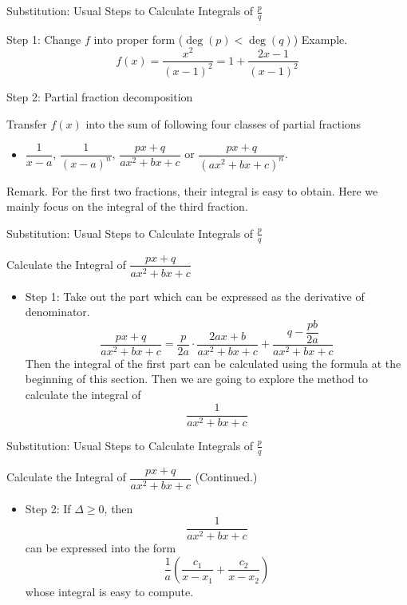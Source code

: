 \documentclass{beamer}
\begin{document}
    \begin{frame}[t]{Substitution: Usual Steps to Calculate Integrals of $\frac{p}{q}$}
        \begin{block}{Step 1: Change $f$ into proper form ($\deg(p) < \deg(q)$)}
            \textcolor{yy}{Example.} $$f(x)=\dfrac{x^2}{(x-1)^2}=1+\dfrac{2x-1}{(x-1)^2}$$
        \end{block}
        \begin{block}{Step 2: Partial fraction decomposition}
            \par Transfer $f(x)$ into the sum of following four classes of partial fractions
            \begin{itemize}
                \item $\dfrac{1}{x-a}$, $\dfrac{1}{(x-a)^{n}}$, $\dfrac{px+q}{ax^{2}+bx+c}$ or $\dfrac{px+q}{(ax^{2}+bx+c)^n}$.
            \end{itemize}
        \end{block}
        \par \textcolor{yy}{Remark.} For the first two fractions, their integral is easy to obtain. Here we mainly focus on the integral of the third fraction.
    \end{frame}

    \begin{frame}[t]{Substitution: Usual Steps to Calculate Integrals of $\frac{p}{q}$}
        \begin{block}{Calculate the Integral of $\dfrac{px+q}{ax^{2}+bx+c}$}
            \begin{itemize}
                \item Step 1: Take out the part which can be expressed as the derivative of denominator.\\
                $$
                \dfrac{px+q}{ax^2+bx+c}=\dfrac{p}{2a}\cdot\dfrac{2ax+b}{ax^2+bx+c}+\dfrac{q-\dfrac{pb}{2a}}{ax^2+bx+c}
                $$ \pause 
                Then the integral of the first part can be calculated using the formula at the beginning of this section. \pause Then we are going to explore the method to calculate the integral of $$\dfrac{1}{ax^{2}+bx+c}$$
            \end{itemize}
        \end{block}
    \end{frame}

    \begin{frame}[t]{Substitution: Usual Steps to Calculate Integrals of $\frac{p}{q}$}
        \begin{block}{Calculate the Integral of $\dfrac{px+q}{ax^{2}+bx+c}$ (Continued.)}
            \begin{itemize}
                \item Step 2: If $\Delta\geq 0$, then $$\dfrac{1}{ax^{2}+bx+c}$$ can be expressed into the form $$\dfrac{1}{a}(\dfrac{c_1}{x-x_1}+\dfrac{c_2}{x-x_2})$$ whose integral is easy to compute.
            \end{itemize}
        \end{block}
    \end{frame}
\end{document}
